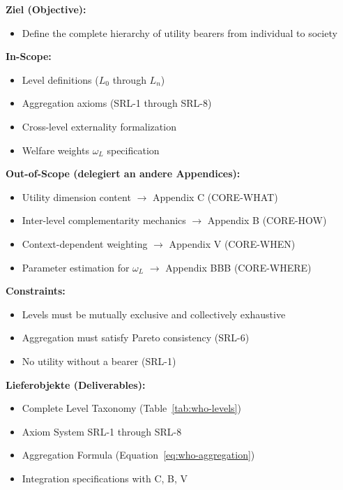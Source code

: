 
\begin{tcolorbox}[
    colback=orange!5!white,
    colframe=orange!75!black,
    title={\textbf{Appendix Scope: Ziel / In-Scope / Out-of-Scope / Constraints}},
    fonttitle=\bfseries
]

\textbf{Ziel (Objective):}
\begin{itemize}[nosep]
    \item Define the complete hierarchy of utility bearers from individual to society
\end{itemize}

\textbf{In-Scope:}
\begin{itemize}[nosep]
    \item Level definitions ($L_0$ through $L_n$)
    \item Aggregation axioms (SRL-1 through SRL-8)
    \item Cross-level externality formalization
    \item Welfare weights $\omega_L$ specification
\end{itemize}

\textbf{Out-of-Scope (delegiert an andere Appendices):}
\begin{itemize}[nosep]
    \item Utility dimension content $\rightarrow$ Appendix C (CORE-WHAT)
    \item Inter-level complementarity mechanics $\rightarrow$ Appendix B (CORE-HOW)
    \item Context-dependent weighting $\rightarrow$ Appendix V (CORE-WHEN)
    \item Parameter estimation for $\omega_L$ $\rightarrow$ Appendix BBB (CORE-WHERE)
\end{itemize}

\textbf{Constraints:}
\begin{itemize}[nosep]
    \item Levels must be mutually exclusive and collectively exhaustive
    \item Aggregation must satisfy Pareto consistency (SRL-6)
    \item No utility without a bearer (SRL-1)
\end{itemize}

\textbf{Lieferobjekte (Deliverables):}
\begin{itemize}[nosep]
    \item Complete Level Taxonomy (Table~\ref{tab:who-levels})
    \item Axiom System SRL-1 through SRL-8
    \item Aggregation Formula (Equation~\ref{eq:who-aggregation})
    \item Integration specifications with C, B, V
\end{itemize}

\end{tcolorbox}

